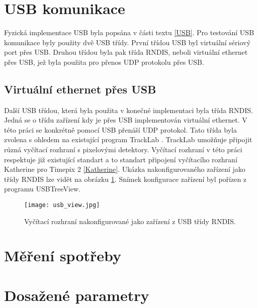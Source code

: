 \section{USB komunikace}
Fyzická implementace USB byla popsána v části textu \ref{USB}. Pro testování USB komunikace byly použity dvě USB třídy. První třídou USB byl virtuální sériový port přes USB. Druhou třídou byla pak třída RNDIS, neboli virtuální ethernet přes USB, jež byla použita pro přenos UDP protokolu přes USB.
\subsection{Virtuální ethernet přes USB}
	Další USB třídou, která byla použita v konečné implementaci byla třída RNDIS. Jedná se o třídu zařízení kdy je přes USB implementován virtuální ethernet. V této práci se konkrétně pomocí USB přenáší UDP protokol. Tato třída byla zvolena s ohledem na existující program TrackLab \cite{Manek_2024}. TrackLab umožňuje připojit různá vyčítací rozhraní s pixelovými detektory. Vyčítací rozhraní v této práci respektuje již existující standart a to standart připojení vyčítacího rozhraní Katherine pro Timepix 2 \ref{Katherine}. Ukázka nakonfigurovaného zařízení jako třídy RNDIS lze vidět na obrázku \ref{fig:RNDIS}. Snímek konfigurace zařízení byl pořízen z programu USBTreeView. 
	\begin{figure}[h!]
		\centering
		\captionsetup{justification=centering}
		\texttt{[image: usb\_view.jpg]}
		\caption{Vyčítací rozhraní nakonfigurované jako zařízení z USB třídy RNDIS.} 
		\label{fig:RNDIS}
	\end{figure}
	

\section{Měření spotřeby}

	
\section{Dosažené parametry}


